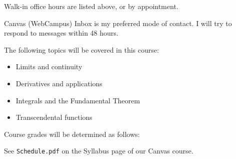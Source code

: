 \documentclass{syllabus}
\begin{document}
\maketitle

Walk-in office hours are listed above, or by appointment.

Canvas (WebCampus) Inbox is my preferred mode of contact. I will try to
respond to messages within 48 hours.

The following topics will be covered in this course:
\begin{itemize}
	\item Limits and continuity
	\item Derivatives and applications
	\item Integrals and the Fundamental Theorem
	\item Transcendental functions
\end{itemize}

Course grades will be determined as follows:


See \texttt{Schedule.pdf} on the Syllabus page of our Canvas course.
\end{document}
